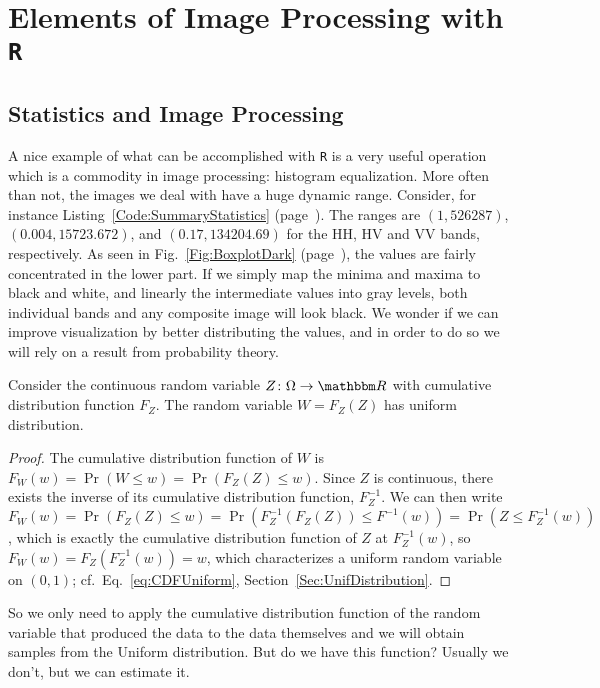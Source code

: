 \chapter[Elements of Image Processing with \texttt{{R}}]{Elements of Image Processing with \texttt{{R}}}\label{Chapter:ElementsR}

\section{Statistics and Image Processing}

A nice example of what can be accomplished with \texttt R is a very useful operation which is a commodity in image processing: histogram equalization.
More often than not, the images we deal with have a huge dynamic range.
Consider, for instance Listing~\ref{Code:SummaryStatistics} (page~\pageref{Code:SummaryStatistics}).
The ranges are 
$(1,526287)$, $(0.004,15723.672) $, and $(0.17,134204.69)$ for the HH, HV and VV bands, respectively.
As seen in Fig.~\ref{Fig:BoxplotDark} (page~\pageref{Fig:BoxplotDark}), the values are fairly concentrated in the lower part.
If we simply map the minima and maxima to black and white, and linearly the intermediate values into gray levels, both individual bands and any composite image will look black.
We wonder if we can improve visualization by better distributing the values, and in order to do so we will rely on a result from probability theory.

\begin{theorem}\label{Theo:FZ}
Consider the continuous random variable $Z\colon \Omega\to\mathbbm R$ with cumulative distribution function $F_Z$.
The random variable $W=F_Z(Z)$ has uniform distribution.
\end{theorem}

\begin{proof}
The cumulative distribution function of $W$ is $F_W(w)=\Pr(W\leq w)=\Pr(F_Z(Z)\leq w)$.
Since $Z$ is continuous, there exists the inverse of its cumulative distribution function, $F^{-1}_Z$.
We can then write 
$F_W(w)=\Pr(F_Z(Z)\leq w) = \Pr(F^{-1}_Z(F_Z(Z)) \leq F^{-1}(w)) = \Pr(Z\leq F^{-1}_Z(w))$, 
which is exactly the cumulative distribution function of $Z$ at $F^{-1}_Z(w)$, so $F_W(w)=F_Z(F^{-1}_Z(w))=w$, which characterizes a uniform random variable on $(0,1)$; cf.\ Eq.~\eqref{eq:CDFUniform}, Section~\ref{Sec:UnifDistribution}.
\end{proof}

So we only need to apply the cumulative distribution function of the random variable that produced the data to the data themselves and we will obtain samples from the Uniform distribution.
But do we have this function?
Usually we don't, but we can estimate it.

